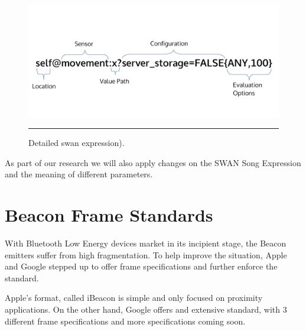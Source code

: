 \begin{figure}[htbp]
  \centering
    \includegraphics[scale=0.6]{Figures/swan_expr.pdf}
    \rule{35em}{0.5pt}
  \caption[Swan Expression]{Detailed swan expression).}
  \label{fig:SwanExpression}
\end{figure}

As part of our research we will also apply changes on the SWAN Song Expression and the meaning of different parameters.

\section{Beacon Frame Standards}
With Bluetooth Low Energy devices market in its incipient stage, the Beacon  emitters suffer from high fragmentation.
To help improve the situation, Apple and Google stepped up to offer frame specifications and further enforce the standard.

Apple's format, called iBeacon is simple and only focused on proximity applications.
On the other hand, Google offers and extensive standard, with 3 different frame specifications and more specifications coming soon.
